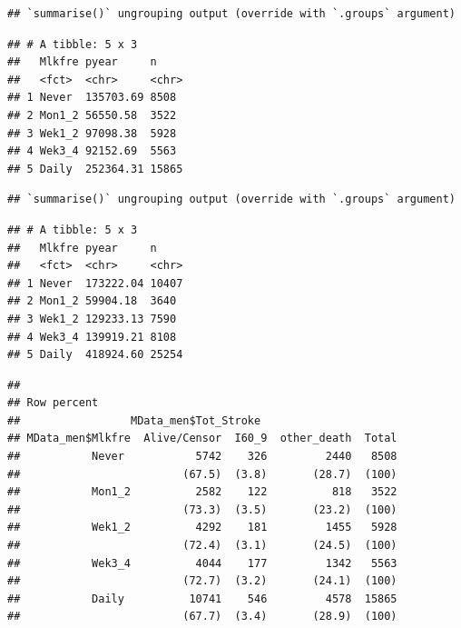\documentclass[
]{article}
\newenvironment{Shaded}{\begin{snugshade}}{\end{snugshade}}
\newcommand{\DataTypeTok}[1]{\textcolor[rgb]{0.13,0.29,0.53}{#1}}
\newcommand{\DecValTok}[1]{\textcolor[rgb]{0.00,0.00,0.81}{#1}}
\newcommand{\KeywordTok}[1]{\textcolor[rgb]{0.13,0.29,0.53}{\textbf{#1}}}
\newcommand{\NormalTok}[1]{#1}
\newcommand{\OperatorTok}[1]{\textcolor[rgb]{0.81,0.36,0.00}{\textbf{#1}}}
\newcommand{\OtherTok}[1]{\textcolor[rgb]{0.56,0.35,0.01}{#1}}
\newcommand{\StringTok}[1]{\textcolor[rgb]{0.31,0.60,0.02}{#1}}
\begin{document}
\begin{verbatim}
## `summarise()` ungrouping output (override with `.groups` argument)
\end{verbatim}

\begin{verbatim}
## # A tibble: 5 x 3
##   Mlkfre pyear     n    
##   <fct>  <chr>     <chr>
## 1 Never  135703.69 8508 
## 2 Mon1_2 56550.58  3522 
## 3 Wek1_2 97098.38  5928 
## 4 Wek3_4 92152.69  5563 
## 5 Daily  252364.31 15865
\end{verbatim}

\begin{Shaded}
\end{Shaded}

\begin{verbatim}
## `summarise()` ungrouping output (override with `.groups` argument)
\end{verbatim}

\begin{verbatim}
## # A tibble: 5 x 3
##   Mlkfre pyear     n    
##   <fct>  <chr>     <chr>
## 1 Never  173222.04 10407
## 2 Mon1_2 59904.18  3640 
## 3 Wek1_2 129233.13 7590 
## 4 Wek3_4 139919.21 8108 
## 5 Daily  418924.60 25254
\end{verbatim}

\begin{Shaded}
\end{Shaded}

\begin{verbatim}
## 
## Row percent 
##                 MData_men$Tot_Stroke
## MData_men$Mlkfre  Alive/Censor  I60_9  other_death  Total
##           Never           5742    326         2440   8508
##                         (67.5)  (3.8)       (28.7)  (100)
##           Mon1_2          2582    122          818   3522
##                         (73.3)  (3.5)       (23.2)  (100)
##           Wek1_2          4292    181         1455   5928
##                         (72.4)  (3.1)       (24.5)  (100)
##           Wek3_4          4044    177         1342   5563
##                         (72.7)  (3.2)       (24.1)  (100)
##           Daily          10741    546         4578  15865
##                         (67.7)  (3.4)       (28.9)  (100)
\end{verbatim}
\end{document}
